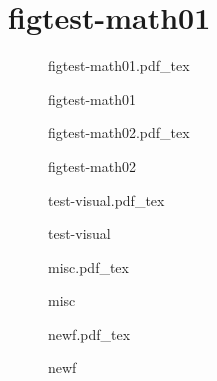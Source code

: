\documentclass{article}
\newcommand{\incfig}[2][1]{%
	\def\svgwidth{#1\columnwidth}
	{#2.pdf_tex}
}
\begin{document}
\section{ figtest-math01}

\begin{figure}[ht]
	\centering
	\incfig{figtest-math01}
	\caption{figtest-math01}
	\label{fig:figtest-math01}
\end{figure}

\begin{figure}[ht]
	\centering
	\incfig{figtest-math02}
	\caption{figtest-math02}
	\label{fig:figtest-math02}
\end{figure}

\begin{figure}[ht]
	\centering
	\incfig{test-visual}
	\caption{test-visual}
	\label{fig:test-visual}
\end{figure}

\begin{figure}[htpb]
	\centering
	\incfig{misc}
	\caption{misc}
	\label{fig:misc}
\end{figure}

\begin{figure}[ht]
	\centering
	\incfig{newf}
	\caption{newf}
	\label{fig:newf}
\end{figure}
\end{document}
